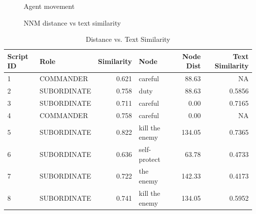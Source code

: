 \documentclass[11pt,dvipdfm]{article}
\begin{document}
\begin{figure}[!htbp]
	\centering
	\begin{minipage}{0.38\textwidth}
		\centering
		\caption{\label{fig:full_trajectory} Agent movement}
	\end{minipage}%
	\begin{minipage}{0.58\textwidth}
		\centering
		\caption{\label{fig:belief_space_vs_text_similarity} NNM distance vs text similarity}
	\end{minipage}%
\end{figure}

\begin{table}[!htbp]
\centering
\begin{tabular}{llrlrr}
	\toprule
	Script ID & Role &  Similarity & Node &  Node Dist &  Text Similarity \\
	\midrule
	1 &    COMMANDER  &       0.621 &         careful &          88.63 &              NA \\
	2 &  SUBORDINATE  &       0.758 &            duty &          88.63 &           0.5856 \\
	3 &  SUBORDINATE  &       0.711 &         careful &           0.00 &           0.7165 \\
	4 &    COMMANDER  &       0.758 &         careful &           0.00 &              NA \\
	5 &  SUBORDINATE  &       0.822 &  kill the enemy &         134.05 &           0.7365 \\
	6 &  SUBORDINATE  &       0.636 &    self-protect &          63.78 &           0.4733 \\
	7 &  SUBORDINATE  &       0.722 &       the enemy &         142.33 &           0.4173 \\
	8 &  SUBORDINATE  &       0.741 &  kill the enemy &         134.05 &           0.5952 \\
	\bottomrule
\end{tabular}
\caption{\label{tab:distance}Distance vs. Text Similarity}
\end{table}
\end{document}
